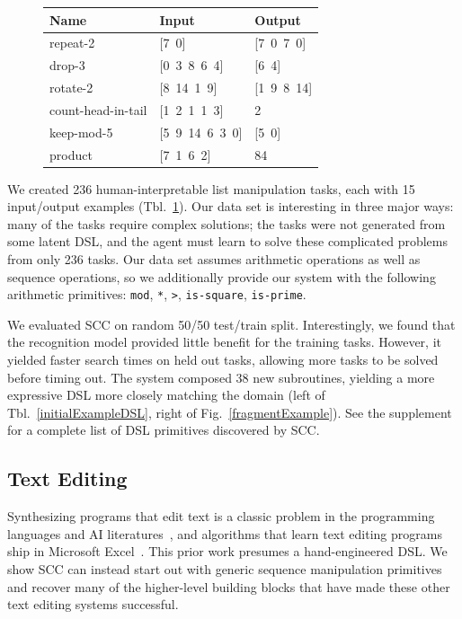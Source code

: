 \documentclass{article}
\newcommand{\system}{\textsc{SCC} }
\newcommand{\systemEnding}{\textsc{SCC}}
\newcommand{\code}[1]{{\footnotesize\texttt{#1}}}
\begin{document}
\begin{figure}\centering
  \begin{tabular}{lll}
    \toprule
    Name & Input & Output \\\midrule
    repeat-2 & [7\, 0] & [7\, 0\, 7\, 0] \\
    drop-3 & [0\, 3\, 8\, 6\, 4] & [6\, 4] \\
    rotate-2 & [8\, 14\, 1\, 9] & [1\, 9\, 8\, 14] \\
    count-head-in-tail & [1\, 2\, 1\, 1\, 3] & 2 \\
    keep-mod-5 & [5\, 9\, 14\, 6\, 3\, 0] & [5\, 0] \\
    product & [7\, 1\, 6\, 2] & 84 \\
    \bottomrule
  \end{tabular}
  \label{listexamples}
\end{figure}
We created 236 human-interpretable list manipulation tasks, each with 15
input/output examples (Tbl.~\ref{listexamples}).
Our data set is interesting in three major ways: many of the tasks require
complex solutions; the tasks were not generated from some latent DSL, and
the agent must learn to solve these complicated problems from only 236
tasks.
Our data set assumes arithmetic operations as well as sequence operations,
so we additionally provide our system with the following arithmetic
primitives: \code{mod}, \code{*}, \code{>}, \code{is-square},
\code{is-prime}.

We evaluated \system on  random 50/50 test/train split.
Interestingly, we found that the recognition model provided little benefit for the training
tasks. However, it yielded faster search times on held out tasks, allowing
more tasks to be solved before timing out.
The system composed 38 new subroutines, yielding a more expressive DSL more closely matching the
domain (left of Tbl.~\ref{initialExampleDSL}, right of
Fig.~\ref{fragmentExample}). See the supplement for a complete list of
DSL primitives discovered by \systemEnding.

\subsection{Text Editing}\label{textSection}
Synthesizing programs that edit text is a classic problem in the
programming languages and AI literatures~\cite{menon2013machine,lau2001programming},
and algorithms that learn text editing programs ship in Microsoft Excel~\cite{gulwani2011automating}.
This prior work presumes a hand-engineered DSL.
We show \system can instead start out with generic sequence manipulation
primitives and recover many of the higher-level building blocks that have
made these other text editing systems successful.
\end{document}
